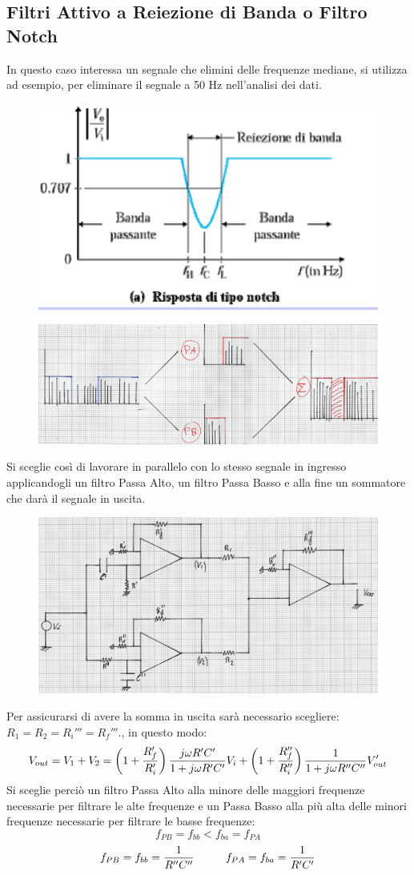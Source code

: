 \documentclass[a4paper, 15pt]{article}
\begin{document}
\subsection{Filtri Attivo a Reiezione di Banda o Filtro Notch}
\begin{adjustwidth}{2in}{}

   		In questo caso interessa un segnale che elimini delle frequenze mediane, si utilizza ad esempio, per eliminare il segnale a 50 Hz nell'analisi dei dati.    		
   		\begin{figure}[H]
   			\centering
   			\includegraphics[width=0.5\linewidth]{immagini/screenshot005}
   			\label{fig:screenshot005}
   		\end{figure}
   		
   		\begin{figure}[H]
   			\centering
   			\includegraphics[width=0.5\linewidth]{immagini/mm(21)}
   			\label{fig:mm21}
   		\end{figure}   	   		
   		Si sceglie così di lavorare in parallelo con lo stesso segnale in ingresso applicandogli un filtro Passa Alto, un filtro Passa Basso e alla fine un sommatore che darà il segnale in uscita.    		
   		\begin{figure}[H]
   			\centering
   			\includegraphics[width=0.5\linewidth]{immagini/mm(23)}
   			\label{fig:mm23}
   		\end{figure}   		   		
   		Per assicurarsi di avere la somma in uscita sarà necessario scegliere: $R_1 = R_2 = R_i''' = R_f'''$., in questo modo: 
   		\[V_{out} = V_1 + V_2 = \left(1+{R_f'\over R_i'}\right){j\omega R'C'\over 1+j\omega R'C'}V_i + \left(1+{R_f''\over R_i''}\right)\dfrac{1}{1+j\omega R''C''}V_{out}' \]
   		Si sceglie perciò un filtro Passa Alto alla minore delle maggiori frequenze necessarie per filtrare le  alte frequenze e un Passa Basso alla più alta delle minori frequenze necessarie per filtrare le basse frequenze:
   		\[f_{PB} = f_{bb} < f_{ba} = f_{PA}\]
   		\[f_{PB} = f_{bb} = {1\over R''C''} \hspace{1cm} f_{PA} = f_{ba} = {1\over R'C'}\]
   		

\end{adjustwidth}
\end{document}
